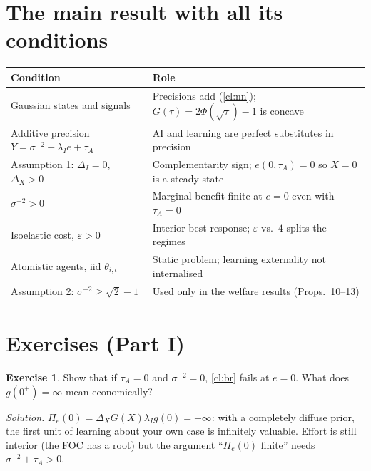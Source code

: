 \documentclass[11pt,a4paper]{article}
\theoremstyle{definition}
\newtheorem{exercise}{Exercise}[section]
\theoremstyle{remark}
\newcommand{\tA}{\tau_A}
\newcommand{\lI}{\lambda_I}
\begin{document}
\section{The main result with all its conditions}

\begin{center}
\begin{tabular}{@{}p{4.2cm}p{10cm}@{}}
\toprule
Condition & Role\\
\midrule
Gaussian states and signals & Precisions add (\cref{cl:nn}); $G(\tau)=2\Phi(\sqrt\tau)-1$ is concave\\
Additive precision $Y=\sigma^{-2}+\lI e+\tA$ & AI and learning are perfect substitutes in precision\\
Assumption 1: $\Delta_I=0$, $\Delta_X>0$ & Complementarity sign; $e(0,\tA)=0$ so $X=0$ is a steady state\\
$\sigma^{-2}>0$ & Marginal benefit finite at $e=0$ even with $\tA=0$\\
Isoelastic cost, $\varepsilon>0$ & Interior best response; $\varepsilon$ vs.\ $4$ splits the regimes\\
Atomistic agents, iid $\theta_{i,t}$ & Static problem; learning externality not internalised\\
Assumption 2: $\sigma^{-2}\ge\sqrt2-1$ & Used only in the welfare results (Props.~10--13)\\
\bottomrule
\end{tabular}
\end{center}

\section{Exercises (Part I)}

\begin{exercise}
Show that if $\tA=0$ and $\sigma^{-2}=0$, \cref{cl:br} fails at $e=0$. What does $g(0^+)=\infty$ mean
economically?
\end{exercise}
\emph{Solution.} $\Pi_e(0)=\Delta_XG(X)\lI g(0)=+\infty$: with a completely diffuse prior, the first unit of
learning about your own case is infinitely valuable. Effort is still interior (the FOC has a root) but the
argument ``$\Pi_e(0)$ finite'' needs $\sigma^{-2}+\tA>0$.
\end{document}
